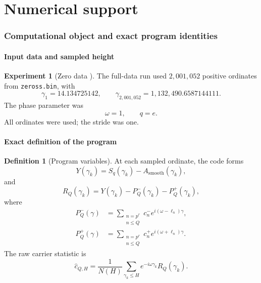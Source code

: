 \documentclass[11pt]{amsart}
\numberwithin{equation}{section}
\theoremstyle{plain}
\theoremstyle{definition}
\newtheorem{definition}[theorem]{Definition}
\newtheorem{experiment}[theorem]{Experiment}
\theoremstyle{remark}
\newcommand{\1}{\mathbf{1}}
\begin{document}
\part{Numerical support}

\section{Computational object and exact program identities}
\label{sec:numerical_program}

\subsection{Input data and sampled height}
\label{subsec:numerical_input_data}

\begin{experiment}[Zero data {\normalfont[Numerical]}]
\label{exp:numerical_zero_data}
The full-data run used $2{,}001{,}052$ positive ordinates from
\texttt{zeross.bin}, with
\begin{equation}
\gamma_1=14.134725142,
\qquad
\gamma_{2{,}001{,}052}=1{,}132{,}490.6587144111.
\label{eq:numerical_zero_endpoints_detailed}
\end{equation}
The phase parameter was
\begin{equation}
\omega=1,
\qquad q=e.
\label{eq:numerical_omega}
\end{equation}
All ordinates were used; the stride was one.
\end{experiment}

\subsection{Exact definition of the program}
\label{subsec:exact_program_definition}

\begin{definition}[Program variables]
\label{def:numerical_program_variables}
At each sampled ordinate, the code forms
\begin{equation}
Y(\gamma_k)
=
S_q(\gamma_k)-A_{\mathrm{smooth}}(\gamma_k),
\label{eq:numerical_Y_program}
\end{equation}
and
\begin{equation}
R_Q(\gamma_k)
=
Y(\gamma_k)-P_Q^-(\gamma_k)-P_Q^+(\gamma_k),
\label{eq:numerical_RQ_program}
\end{equation}
where
\begin{align}
P_Q^-(\gamma)
&=
\sum_{\substack{n=p^r\\n\leq Q}}
 c_n^-e^{i(\omega-\ell_n)\gamma},
\label{eq:numerical_PQ_minus}
\\
P_Q^+(\gamma)
&=
\sum_{\substack{n=p^r\\n\leq Q}}
 c_n^+e^{i(\omega+\ell_n)\gamma}.
\label{eq:numerical_PQ_plus}
\end{align}
The raw carrier statistic is
\begin{equation}
\widehat c_{Q,H}
=
\frac1{N(H)}
\sum_{\gamma_k\leq H}
e^{-i\omega\gamma_k}R_Q(\gamma_k).
\label{eq:numerical_raw_carrier}
\end{equation}
\end{definition}
\end{document}
